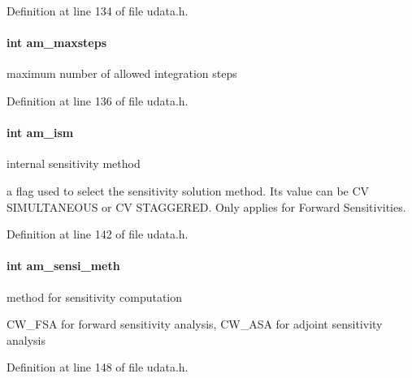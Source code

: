 Definition at line 134 of file udata.\+h.

\hypertarget{struct_user_data_a0187950731c16f2857d0cd5b92416352}{}
\paragraph[{am\+\_\+maxsteps}]{\setlength{\rightskip}{0pt plus 5cm}int am\+\_\+maxsteps}\label{struct_user_data_a0187950731c16f2857d0cd5b92416352}
maximum number of allowed integration steps 

Definition at line 136 of file udata.\+h.

\hypertarget{struct_user_data_a1f2514c0ee00da61ade386173b718a02}{}
\paragraph[{am\+\_\+ism}]{\setlength{\rightskip}{0pt plus 5cm}int am\+\_\+ism}\label{struct_user_data_a1f2514c0ee00da61ade386173b718a02}
internal sensitivity method

a flag used to select the sensitivity solution method. Its value can be C\+V S\+I\+M\+U\+L\+T\+A\+N\+E\+O\+U\+S or C\+V S\+T\+A\+G\+G\+E\+R\+E\+D. Only applies for Forward Sensitivities. 

Definition at line 142 of file udata.\+h.

\hypertarget{struct_user_data_a83bc6716ecf3decb3d963929361fcd6d}{}
\paragraph[{am\+\_\+sensi\+\_\+meth}]{\setlength{\rightskip}{0pt plus 5cm}int am\+\_\+sensi\+\_\+meth}\label{struct_user_data_a83bc6716ecf3decb3d963929361fcd6d}
method for sensitivity computation

C\+W\+\_\+\+F\+S\+A for forward sensitivity analysis, C\+W\+\_\+\+A\+S\+A for adjoint sensitivity analysis 

Definition at line 148 of file udata.\+h.

\hypertarget{struct_user_data_a03fa52449ab4bb9a1a75312fd9064db1}{}
